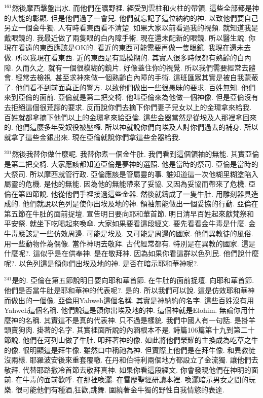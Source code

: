 \documentclass{book}
\begin{document}
$^{161}$然後摩西擊盤出水.
而他們在曠野裡.
經受到雲柱和火柱的帶領.
這些全部都是神的大能的彰顯.
但是他們過了一會兒.
他們就忘記了這位納約的神.
以致他們要自己另立一個金牛獨.
人有時看東西看不清楚.
如果大家以前看過我的視頻.
就知道我是戴眼鏡的.
我最近做了兩隻眼的白內障手術.
現在還未配新的眼鏡.
所以醫生說.
你現在看遠的東西應該是OK的.
看近的東西可能需要再做一隻眼鏡.
我現在還未去做.
所以我現在看東西.
近的東西是有點模糊的.
其實人很多時候都有熟齡的白內障.
久而久之.
就有一個很模糊的鏡片.
好像蓋住你的視覺.
所以我們需要經常去體會.
經常去檢視.
甚至求神來做一個熟齡白內障的手術.
這班匯眾其實是被自我蒙蔽了.
他們看不到前面真正的警方.
以致他們做出一些很愚昧的要求.
百姓無知.
他們來到亞倫的面前.
亞倫就是第二把交椅.
他叫亞倫來為他做一個神像.
但是亞倫沒有去拒絕這個很荒謬的要求.
反而說你們去摘下你們妻子兒女以上的金環拿來給我.
百姓就都拿摘下他們以上的金環拿來給亞倫.
這些金器當然是從埃及人那裡拿回來的.
他們這麼多年受奴役被壓榨.
所以神就說你們向埃及人討你們過去的補身.
所以就拿了這些金銀出來.
現在亞倫就說你們拿這些金器給我.

$^{201}$然後我替你做什麼呢.
我替你煮一個金牛肚.
我們看到這個領袖的無能.
其實亞倫是第二把交椅.
大家應該都知道亞倫是夢神的選照.
他是當時的祭司.
亞倫是當時的大祭司.
所以摩西就管行政.
亞倫應該是管屬靈的事.
誰知道這一次他糊里糊塗陷入屬靈的危機.
是他的無能.
因為他的無能帶來了妥協.
又因為妥協而帶來了危機.
亞倫在第四節說.
他從他們手裡接過這些金器.
然後就鑄成了一隻牛肚.
用雕刻器具造成的.
他們就說以色列是使你出埃及地的神.
領袖無能做出一個妥協的行動.
亞倫在第五節在牛肚的面前捉壇.
宣告明日要向耶和華首節.
明日清早百姓起來獻梵祭和平安祭.
就坐下吃喝起來喚傘.
大家如果要看這段經文.
要先看看金牛毒是什麼.
金牛毒應該是一些仿效周邊.
可能是埃及.
又可能是周邊的國家.
他們異教徒的風俗.
用一些動物作為偶像.
當作神明去敬拜.
古代經常都有.
特別是在異教的國家.
這是什麼呢?.
這似乎是在供奉神.
是在敬拜神.
因為如果你看這群以色列民.
他們說什麼呢?.
以色列這是領你們出埃及地的神.
是否在暗示耶和華神呢?.

$^{241}$是的.
亞倫在第五節說明日要向耶和華首節.
在牛肚的面前捉壇.
向耶和華首節.
他們是否當牛肚是耶和華神的代表呢?.
是的.
所以我們可以說.
這是仿效耶和華神而做出的一個像.
亞倫用Yahweh這個名稱.
其實是神納約的名字.
這些百姓沒有用Yahweh這個名稱.
他們說這是領你出埃及地的神.
這個神就是Elohim.
無論你用什麼神的名稱.
其實這不是真的代表神.
只不過是樣貌.
我們中國人有一句話.
是掛羊頭賣狗肉.
掛著的名字.
其實裡面所說的內涵根本不是.
詩篇106篇第十九到第二十節說.
他們在河列山做了牛肚.
叩拜著神的像.
如此將他們榮耀的主換成為吃草之牛的像.
很明顯這是拜牛像.
雖然口中稱祂為神.
但實際上他們是在拜牛像.
和異教徒沒兩樣.
耶羅波安後來重套覆轍.
在丹和伯特利兩個地方都設立了金流獨.
讓他們去敬拜.
代替耶路撒冷首節去敬拜真神.
如果你看這段經文.
你會發現他們在神明的面前.
在牛毒的面前歡呼.
在那裡喚灑.
在雷歷聖經研讀本裡.
喚灑暗示男女之間的玩樂.
很可能他們有種酒,狂歡,跳舞.
圍繞著金牛獨的野性自我情慾的表達.
\end{document}
